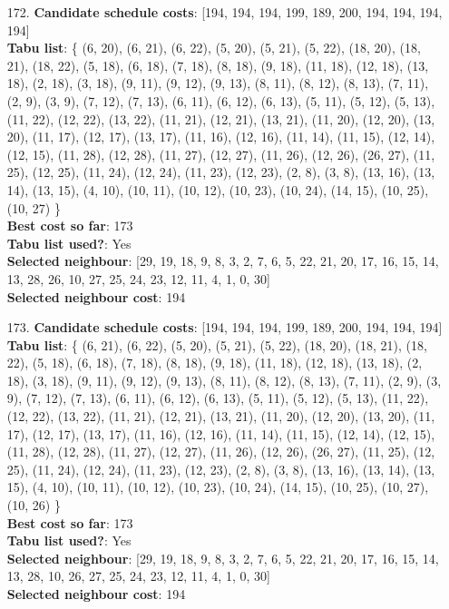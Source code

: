 \documentclass[fleqn]{article}
\begin{document}
\begin{itemize}
    \item[172.] \textbf{Candidate schedule costs}: [194, 194, 194, 199, 189, 200, 194, 194, 194, 194] \\
    \textbf{Tabu list}: \{ (6, 20), (6, 21), (6, 22), (5, 20), (5, 21), (5, 22), (18, 20), (18, 21), (18, 22), (5, 18), (6, 18), (7, 18), (8, 18), (9, 18), (11, 18), (12, 18), (13, 18), (2, 18), (3, 18), (9, 11), (9, 12), (9, 13), (8, 11), (8, 12), (8, 13), (7, 11), (2, 9), (3, 9), (7, 12), (7, 13), (6, 11), (6, 12), (6, 13), (5, 11), (5, 12), (5, 13), (11, 22), (12, 22), (13, 22), (11, 21), (12, 21), (13, 21), (11, 20), (12, 20), (13, 20), (11, 17), (12, 17), (13, 17), (11, 16), (12, 16), (11, 14), (11, 15), (12, 14), (12, 15), (11, 28), (12, 28), (11, 27), (12, 27), (11, 26), (12, 26), (26, 27), (11, 25), (12, 25), (11, 24), (12, 24), (11, 23), (12, 23), (2, 8), (3, 8), (13, 16), (13, 14), (13, 15), (4, 10), (10, 11), (10, 12), (10, 23), (10, 24), (14, 15), (10, 25), (10, 27) \} \\
    \textbf{Best cost so far}: 173 \\
    \textbf{Tabu list used?}: Yes \\
    \textbf{Selected neighbour}: [29, 19, 18, 9, 8, 3, 2, 7, 6, 5, 22, 21, 20, 17, 16, 15, 14, 13, 28, 26, 10, 27, 25, 24, 23, 12, 11, 4, 1, 0, 30] \\
    \textbf{Selected neighbour cost}: 194
      

    \item[173.] \textbf{Candidate schedule costs}: [194, 194, 194, 199, 189, 200, 194, 194, 194] \\
    \textbf{Tabu list}: \{ (6, 21), (6, 22), (5, 20), (5, 21), (5, 22), (18, 20), (18, 21), (18, 22), (5, 18), (6, 18), (7, 18), (8, 18), (9, 18), (11, 18), (12, 18), (13, 18), (2, 18), (3, 18), (9, 11), (9, 12), (9, 13), (8, 11), (8, 12), (8, 13), (7, 11), (2, 9), (3, 9), (7, 12), (7, 13), (6, 11), (6, 12), (6, 13), (5, 11), (5, 12), (5, 13), (11, 22), (12, 22), (13, 22), (11, 21), (12, 21), (13, 21), (11, 20), (12, 20), (13, 20), (11, 17), (12, 17), (13, 17), (11, 16), (12, 16), (11, 14), (11, 15), (12, 14), (12, 15), (11, 28), (12, 28), (11, 27), (12, 27), (11, 26), (12, 26), (26, 27), (11, 25), (12, 25), (11, 24), (12, 24), (11, 23), (12, 23), (2, 8), (3, 8), (13, 16), (13, 14), (13, 15), (4, 10), (10, 11), (10, 12), (10, 23), (10, 24), (14, 15), (10, 25), (10, 27), (10, 26) \} \\
    \textbf{Best cost so far}: 173 \\
    \textbf{Tabu list used?}: Yes \\
    \textbf{Selected neighbour}: [29, 19, 18, 9, 8, 3, 2, 7, 6, 5, 22, 21, 20, 17, 16, 15, 14, 13, 28, 10, 26, 27, 25, 24, 23, 12, 11, 4, 1, 0, 30] \\
    \textbf{Selected neighbour cost}: 194
      


\end{itemize}
\end{document}
